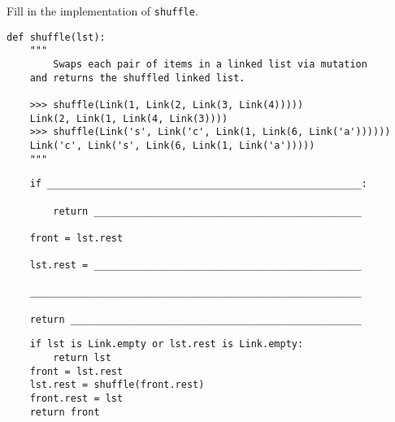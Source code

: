 \begin{blocksection}
\question Fill in the implementation of \lstinline$shuffle$.

\begin{lstlisting}
def shuffle(lst):
    """
		Swaps each pair of items in a linked list via mutation 
    and returns the shuffled linked list.

    >>> shuffle(Link(1, Link(2, Link(3, Link(4)))))
    Link(2, Link(1, Link(4, Link(3))))
    >>> shuffle(Link('s', Link('c', Link(1, Link(6, Link('a'))))))
    Link('c', Link('s', Link(6, Link(1, Link('a')))))
    """
\end{lstlisting}

\ifprintanswers\else
\begin{lstlisting}
    if ______________________________________________________:

        return ______________________________________________

    front = lst.rest

    lst.rest = ______________________________________________

    _________________________________________________________

    return __________________________________________________
\end{lstlisting}
\fi

\begin{solution}
\begin{lstlisting}
    if lst is Link.empty or lst.rest is Link.empty:
        return lst
    front = lst.rest
    lst.rest = shuffle(front.rest)
    front.rest = lst
    return front
\end{lstlisting}
\end{solution}
\end{blocksection}
